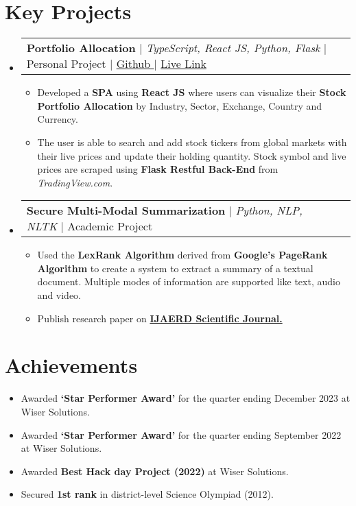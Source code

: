 \documentclass[letterpaper,11pt]{article}
\makeatletter
\newcommand{\resumeItem}[1]{
    \item\small{
        {#1}
    }
}
\newcommand{\resumeProjectHeading}[1]{
    \item
    \begin{tabular*}{1.0\textwidth}{l@{\extracolsep{\fill}}r}
    \small#1\\
    \end{tabular*}\vspace{-7pt}
}
\newcommand{\resumeSubHeadingListStart}{\begin{itemize}[leftmargin=0.0in, label={}]}
\newcommand{\resumeSubHeadingListEnd}{\end{itemize}}
\newcommand{\resumeItemListStart}{\begin{itemize}}
\newcommand{\resumeItemListEnd}{\end{itemize}}
\makeatother
\begin{document}
\section{Key Projects}
\resumeSubHeadingListStart
    \resumeProjectHeading
    {\textbf{Portfolio Allocation} $|$ \emph{TypeScript, React JS, Python, Flask} $|$ Personal Project $|$ \href{https://github.com/Akkisdiary/portfolio-allocation}{Github \faExternalLink*} $|$ \href{https://portfolio-allocation.netlify.app/}{Live Link \faExternalLink*}}
        \resumeItemListStart
            \resumeItem
            {Developed a \textbf{SPA} using \textbf{React JS} where users can visualize their \textbf{Stock Portfolio Allocation} by Industry, Sector, Exchange, Country and Currency.}
            \resumeItem
            {The user is able to search and add stock tickers from global markets with their live prices and update their holding quantity. Stock symbol and live prices are scraped using \textbf{Flask Restful Back-End} from \emph{TradingView.com}.}
        \resumeItemListEnd
        \resumeProjectHeading
        {\textbf{Secure Multi-Modal Summarization} $|$ \emph{Python, NLP, NLTK} $|$ Academic Project}
        \resumeItemListStart
            \resumeItem
            {Used the \textbf{LexRank Algorithm} derived from \textbf{Google's PageRank Algorithm} to create a system to extract a summary of a textual document. Multiple modes of information are supported like text, audio and video.}
            \resumeItem
            {Publish research paper on \href{https://drive.google.com/file/d/1Ik8ADmgQ161ozwnP4DED0riZerrP4JPw/view?usp=sharing}{\textbf{IJAERD Scientific Journal.} \faExternalLink*}}
        \resumeItemListEnd
\resumeSubHeadingListEnd


\section{Achievements}
\resumeItemListStart
    \resumeItem
    {Awarded \textbf{`Star Performer Award'} for the quarter ending December 2023 at Wiser Solutions. \href{https://drive.google.com/file/d/11RvsYKlJ9UAnp2LHTLOc-FF-gGJzbBXb/view?usp=sharing}{\faExternalLink*}}
    \resumeItem
    {Awarded \textbf{`Star Performer Award'} for the quarter ending September 2022 at Wiser Solutions. \href{https://drive.google.com/file/d/1SLFl3xMEQQykWYrRkAzT4aPqpjl47jUr/view?usp=share_link}{\faExternalLink*}}
    \resumeItem
    {Awarded \textbf{Best Hack day Project (2022)} at Wiser Solutions.}
    \resumeItem
    {Secured \textbf{1st rank} in district-level Science Olympiad (2012).}
\resumeItemListEnd
 
\end{document}
